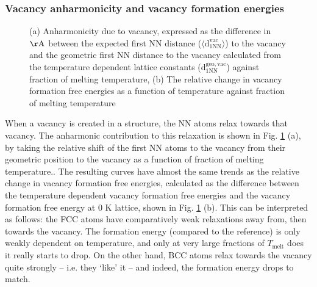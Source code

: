 \documentclass{article}
\begin{document}
\subsubsection{Vacancy anharmonicity and vacancy formation energies}

\begin{figure}[!htp]
\centering
{}
\hfill
\caption{(a) Anharmonicity due to vacancy, expressed as the difference in $\mathrm{\AA}$ between the expected first NN distance ($\langle \mathrm{d_{1NN}^{vac}} \rangle$) to the vacancy and the geometric first NN distance to the vacancy calculated from the temperature dependent lattice constants ($\mathrm{d_{1NN}^{geo, vac}}$) against fraction of melting temperature, (b) The relative change in vacancy formation free energies as a function of temperature against fraction of melting temperature}
\label{fig:21}
\end{figure}

When a vacancy is created in a structure, the NN atoms relax towards that vacancy. The anharmonic contribution to this relaxation is shown in Fig. \ref{fig:21} (a), by taking the relative shift of the first NN atoms to the vacancy from their geometric position to the vacancy as a function of fraction of melting temperature.. The resulting curves have almost the same trends as the relative change in vacancy formation free energies, calculated as the difference between the temperature dependent vacancy formation free energies and the vacancy formation free energy at 0 K lattice, shown in Fig. \ref{fig:21} (b). This can be interpreted as follows: the FCC atoms have comparatively weak relaxations away from, then towards the vacancy. The formation energy (compared to the reference) is only weakly dependent on temperature, and only at very large fractions of $T_{\mathrm{melt}}$ does it really starts to drop. On the other hand, BCC atoms relax towards the vacancy quite strongly -- i.e. they \enquote*{like} it -- and indeed, the formation energy drops to match.
\end{document}
